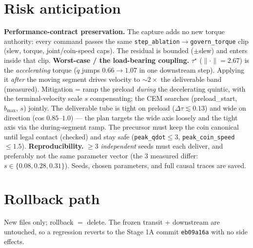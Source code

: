 \documentclass[11pt]{article}
\newcommand{\code}[1]{\texttt{\small #1}}
\begin{document}
\section{Risk anticipation}
\textbf{Performance-contract preservation.} The capture adds no new torque authority: every command passes the same
\code{step\_ablation}$\to$\code{govern\_torque} clip (slew, torque, joint/coin-speed caps). The residual is bounded
($\pm$slew) and enters inside that clip.
\smallskip\noindent\textbf{Worst-case / the load-bearing coupling.} $\tau^\star$ ($\lVert\cdot\rVert{=}2.67$) is the
\emph{accelerating} torque ($\dot q$ jumps $0.66\to1.07$ in one downstream step). Applying it \emph{after} the moving
segment drives velocity to $\sim 2\times$ the deliverable band (measured). Mitigation = ramp the preload \emph{during}
the decelerating quintic, with the terminal-velocity scale $s$ compensating; the CEM searches (preload\_start, $b_{\max}$,
$s$) jointly. The deliverable tube is tight on preload ($\Delta\tau\lesssim0.13$) and wide on direction (cos $0.85$--$1.0$)
--- the plan targets the wide axis loosely and the tight axis via the during-segment ramp. The precursor must keep the
coin canonical until legal contact (checked) and stay safe (\code{peak\_qdot}$\le3$, \code{peak\_coin\_speed}$\le1.5$).
\smallskip\noindent\textbf{Reproducibility.} $\ge3$ \emph{independent} seeds must each deliver, and preferably not the
same parameter vector (the 3 measured differ: $s\in\{0.08,0.28,0.31\}$). Seeds, chosen parameters, and full causal traces
are saved.

\section{Rollback path}
New files only; rollback $=$ delete. The frozen transit + downstream are untouched, so a regression reverts to the Stage
1A commit \code{eb09a16a} with no side effects.
\end{document}
